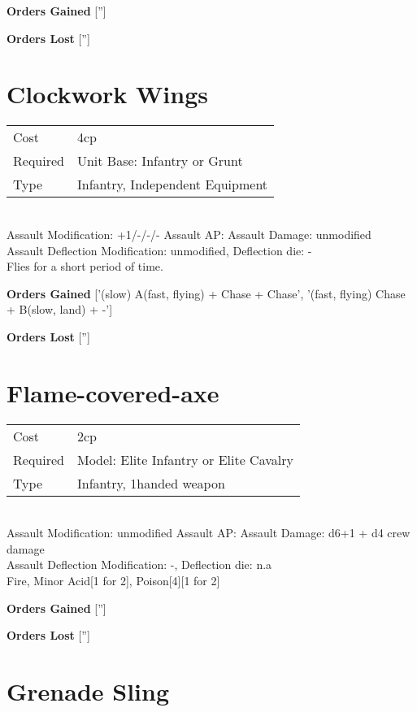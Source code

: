 {\bf Orders Gained}
['']

{\bf Orders Lost}
['']
\section{ Clockwork Wings }

\begin{tabular}{ll}
    Cost & 4cp \\
    Required & Unit Base: Infantry or Grunt\\
    Type & Infantry, Independent Equipment\\
\end{tabular}
\ \\
Assault Modification: +1/-/-/- Assault AP:  Assault Damage: unmodified\\
Assault Deflection Modification: unmodified, Deflection die: - \\


Flies for a short period of time.

{\bf Orders Gained}
['(slow) A(fast, flying) + Chase + Chase', '(fast, flying) Chase + B(slow, land) + -']

{\bf Orders Lost}
['']
\section{ Flame-covered-axe }

\begin{tabular}{ll}
    Cost & 2cp \\
    Required & Model: Elite Infantry or Elite Cavalry\\
    Type & Infantry, 1handed weapon\\
\end{tabular}
\ \\
Assault Modification: unmodified Assault AP:  Assault Damage: d6+1 + d4 crew damage\\
Assault Deflection Modification: -, Deflection die: n.a \\
Fire, Minor Acid[1 for 2], Poison[4][1 for 2]



{\bf Orders Gained}
['']

{\bf Orders Lost}
['']
\section{ Grenade Sling }

